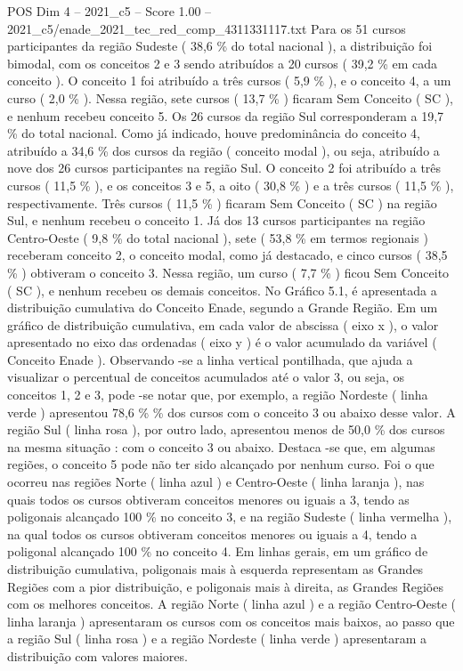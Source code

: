 \begin{textsample}{POS Dim 4 – 2021\_c5 – Score 1.00 – 2021\_c5/enade\_2021\_tec\_red\_comp\_4311331117.txt}
Para os 51 cursos participantes da região Sudeste ( 38,6 \% do total nacional ), a distribuição foi bimodal, com os conceitos 2 e 3 sendo atribuídos a 20 cursos ( 39,2 \% em cada conceito ).
O conceito 1 foi atribuído a três cursos ( 5,9 \% ), e o conceito 4, a um curso ( 2,0 \% ).
Nessa região, sete cursos ( 13,7 \% ) ficaram Sem Conceito ( SC ), e nenhum recebeu conceito 5.
Os 26 cursos da região Sul corresponderam a 19,7 \% do total nacional.
Como já indicado, houve predominância do conceito 4, atribuído a 34,6 \% dos cursos da região ( conceito modal ), ou seja, atribuído a nove dos 26 cursos participantes na região Sul.
O conceito 2 foi atribuído a três cursos ( 11,5 \% ), e os conceitos 3 e 5, a oito ( 30,8 \% ) e a três cursos ( 11,5 \% ), respectivamente.
Três cursos ( 11,5 \% ) ficaram Sem Conceito ( SC ) na região Sul, e nenhum recebeu o conceito 1.
Já dos 13 cursos participantes na região Centro-Oeste ( 9,8 \% do total nacional ), sete ( 53,8 \% em termos regionais ) receberam conceito 2, o conceito modal, como já destacado, e cinco cursos ( 38,5 \% ) obtiveram o conceito 3.
Nessa região, um curso ( 7,7 \% ) ficou Sem Conceito ( SC ), e nenhum recebeu os demais conceitos.
No Gráfico 5.1, é apresentada a distribuição cumulativa do Conceito Enade, segundo a Grande Região.
Em um gráfico de distribuição cumulativa, em cada valor de abscissa ( eixo x ), o valor apresentado no eixo das ordenadas ( eixo y ) é o valor acumulado da variável ( Conceito Enade ).
Observando -se a linha vertical pontilhada, que ajuda a visualizar o percentual de conceitos acumulados até o valor 3, ou seja, os conceitos 1, 2 e 3, pode -se notar que, por exemplo, a região Nordeste ( linha verde ) apresentou 78,6 \% \% dos cursos com o conceito 3 ou abaixo desse valor.
A região Sul ( linha rosa ), por outro lado, apresentou menos de 50,0 \% dos cursos na mesma situação : com o conceito 3 ou abaixo.
Destaca -se que, em algumas regiões, o conceito 5 pode não ter sido alcançado por nenhum curso.
Foi o que ocorreu nas regiões Norte ( linha azul ) e Centro-Oeste ( linha laranja ), nas quais todos os cursos obtiveram conceitos menores ou iguais a 3, tendo as poligonais alcançado 100 \% no conceito 3, e na região Sudeste ( linha vermelha ), na qual todos os cursos obtiveram conceitos menores ou iguais a 4, tendo a poligonal alcançado 100 \% no conceito 4.
Em linhas gerais, em um gráfico de distribuição cumulativa, poligonais mais à esquerda representam as Grandes Regiões com a pior distribuição, e poligonais mais à direita, as Grandes Regiões com os melhores conceitos.
A região Norte ( linha azul ) e a região Centro-Oeste ( linha laranja ) apresentaram os cursos com os conceitos mais baixos, ao passo que a região Sul ( linha rosa ) e a região Nordeste ( linha verde ) apresentaram a distribuição com valores maiores.

\end{textsample}
